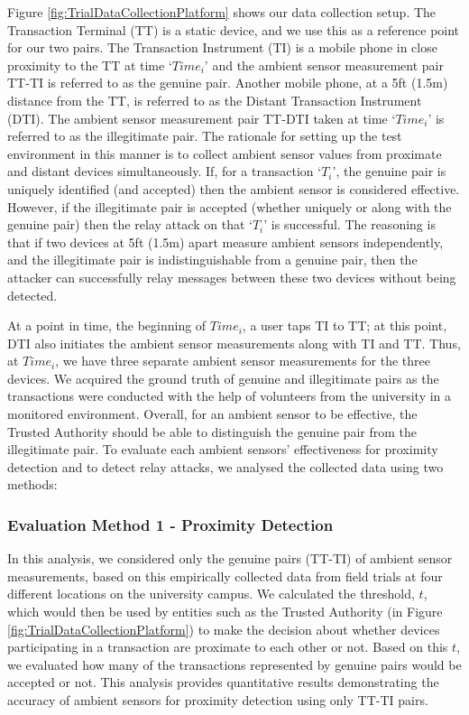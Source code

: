 \documentclass[runningheads,a4paper]{llncs}
\begin{document}
Figure \ref{fig:TrialDataCollectionPlatform} shows our data collection setup. The Transaction Terminal (TT) is a static device, and we use this as a reference point for our two pairs. The Transaction Instrument (TI) is a mobile phone in close proximity to the TT at time `$Time_i$' and the ambient sensor measurement pair TT-TI is referred to as the genuine pair. Another mobile phone, at a 5ft (1.5m) distance from the TT, is referred to as the Distant Transaction Instrument (DTI). The ambient sensor measurement pair TT-DTI taken at time `$Time_i$' is referred to as the illegitimate pair.  The rationale for setting up the test environment in this manner is to collect ambient sensor values from proximate and distant devices simultaneously. If, for a transaction `$T_i$', the genuine pair is uniquely identified (and accepted) then the ambient sensor is considered effective. However, if the illegitimate pair is accepted (whether uniquely or along with the genuine pair) then the relay attack on that `$T_i$' is successful. The reasoning is that if two devices at 5ft (1.5m) apart measure ambient sensors independently, and the illegitimate pair is indistinguishable from a genuine pair, then the attacker can successfully relay messages between these two devices without being detected. 

At a point in time, the beginning of $Time_i$, a user taps TI to TT; at this point, DTI also initiates the ambient sensor measurements along with TI and TT.  Thus, at $Time_i$, we have three separate ambient sensor measurements for the three devices.  We acquired the ground truth of genuine and illegitimate pairs as the transactions were conducted with the help of volunteers from the university in a monitored environment.  Overall, for an ambient sensor to be effective, the Trusted Authority should be able to distinguish the genuine pair from the illegitimate pair. To evaluate each ambient sensors’ effectiveness for proximity detection and to detect relay attacks, we analysed the collected data using two methods:
\subsubsection{Evaluation Method 1 - Proximity Detection}
In this analysis, we considered only the genuine pairs (TT-TI) of ambient sensor measurements, based on this empirically collected data from field trials at four different locations on the university campus. We calculated the threshold, $t$, which would then be used by entities such as the Trusted Authority (in Figure \ref{fig:TrialDataCollectionPlatform}) to make the decision about whether devices participating in a transaction are proximate to each other or not. Based on this $t$, we evaluated how many of the transactions represented by genuine pairs would be accepted or not. This analysis provides quantitative results demonstrating the accuracy of ambient sensors for proximity detection using only TT-TI pairs.
\end{document}
